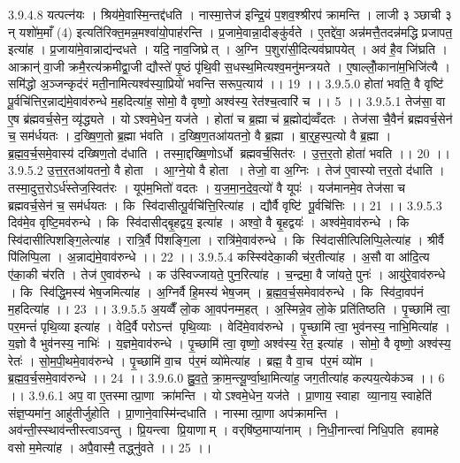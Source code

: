 3.9.4.8
यत्पत्न॑यः । श्रिय॑मे॒वास्मि॒न्तद्द॑धति । नास्मा॒त्तेज॑ इन्द्रि॒यं प॒शव॒श्श्रीरप॑ क्रामन्ति । लाजी ३ ञ्छाची ३ न् यशो॑म॒माँ (4) इत्यति॑रिक्त॒मन्न॒मश्वा॑यो॒पाह॑रन्ति । प्र॒जामे॒वान्ना॒दीङ्कु॑र्वते । ए॒तद्दे॑वा॒ अन्न॑मत्तै॒तदन्न॑मद्धि प्रजापत॒ इत्या॑ह । प्र॒जाया॑मे॒वान्नाद्य॑न्दधते । यदि॒ नाव॒जिघ्रेत् । अ॒ग्नि प॒शुरा॑सी॒दित्यव॑घ्रापयेत् । अव॑ है॒व जि॑घ्रति । आक्रान्॑ वा॒जी क्रमै॒रत्य॑क्रमीद्वा॒जी द्यौस्ते॑ पृ॒ष्ठं पृ॑थि॒वी स॒धस्थ॒मित्यश्व॒मनु॑मन्त्रयते । ए॒षाल्लोँ॒काना॑म॒भिजि॑त्यै । समि॑द्धो अ॒ञ्जन्कृद॑रं मती॒नामित्यश्व॑स्या॒प्रियो॑ भवन्ति सरूप॒त्याय॑ ।। 19 ।।
3.9.5.0
होता॑ भवति॒ वै वृष्टि॑ पू॒र्वचि॑त्तिर॒न्नाद्य॑मे॒वाव॑रुन्धे म॒हदित्या॑ह॒ सोमो॒ वै वृष्णो॒ अश्व॑स्य॒ रेत॑श्च॒त्वारि॑ च ।। 5 ।।
3.9.5.1
तेज॑सा॒ वा ए॒ष ब्र॑ह्मवर्च॒सेन॒ व्यृ॑द्ध्यते । योऽश्वमे॒धेन॒ यज॑ते । होता॑ च ब्र॒ह्मा च॑ ब्र॒ह्मोद्य॑व्वँदतः । तेज॑सा चै॒वैनं॑ ब्रह्मवर्च॒सेन॑ च॒ सम॑र्धयतः । द॒ख्षि॒ण॒तो ब्र॒ह्मा भ॑वति । द॒ख्षि॒ण॒तआ॑यतनो॒ वै ब्र॒ह्मा । बा॒र्॒ह॒स्प॒त्यो वै ब्र॒ह्मा । ब्र॒ह्म॒व॒र्च॒समे॒वास्य॑ दख्षिण॒तो द॑धाति । तस्मा॒द्दख्षि॒णोऽर्धो ब्रह्मवर्च॒सित॑रः । उ॒त्त॒र॒तो होता॑ भवति ।। 20 ।।
3.9.5.2
उ॒त्त॒र॒तआ॑यतनो॒ वै होता । आ॒ग्ने॒यो वै होता । तेजो॒ वा अ॒ग्निः । तेज॑ ए॒वास्योत्तर॒तो द॑धाति । तस्मा॒दुत्त॒रोऽर्ध॑स्तेज॒स्वित॑रः । यूप॑म॒भितो॑ वदतः । य॒ज॒मा॒न॒दे॒व॒त्यो॑ वै यूपः॑ । यज॑मानमे॒व तेज॑सा च ब्रह्मवर्च॒सेन॑ च॒ सम॑र्धयतः । कि स्वि॑दासीत्पू॒र्वचि॑त्ति॒रित्या॑ह । द्यौर्वै वृष्टि॑ पू॒र्वचि॑त्तिः ।। 21 ।।
3.9.5.3
दिव॑मे॒व वृष्टि॒मव॑रुन्धे । कि स्वि॑दासीद्बृ॒हद्वय॒ इत्या॑ह । अश्वो॒ वै बृ॒हद्वयः॑ । अश्व॑मे॒वाव॑रुन्धे । कि स्वि॑दासीत्पिशङ्गि॒लेत्या॑ह । रात्रि॒र्वै पि॑शङ्गि॒ला । रात्रि॑मे॒वाव॑रुन्धे । कि स्वि॑दासीत्पिलिप्पि॒लेत्या॑ह । श्रीर्वै पि॑लिप्पि॒ला । अ॒न्नाद्य॑मे॒वाव॑रुन्धे ।। 22 ।।
3.9.5.4
कस्स्वि॑देका॒की च॑र॒तीत्या॑ह । अ॒सौ वा आ॑दि॒त्य ए॑का॒की च॑रति । तेज॑ ए॒वाव॑रुन्धे । क उ॑स्विज्जायते॒ पुन॒रित्या॑ह । च॒न्द्रमा॒ वै जा॑यते॒ पुनः॑ । आयु॑रे॒वाव॑रुन्धे । कि स्वि॑द्धि॒मस्य॑ भेष॒जमित्या॑ह । अ॒ग्निर्वै हि॒मस्य॑ भेष॒जम् । ब्र॒ह्म॒व॒र्च॒समेवाव॑रुन्धे । कि स्वि॑दा॒वप॑नं म॒हदित्या॑ह ।। 23 ।।
3.9.5.5
अ॒यव्वैँ लो॒क आ॒वप॑नम्म॒हत् । अ॒स्मिन्ने॒व लो॒के प्रति॑तिष्ठति । पृ॒च्छामि॑ त्वा॒ पर॒मन्तं॑ पृथि॒व्या इत्या॑ह । वेदि॒र्वै परोऽन्त॑ पृथि॒व्याः । वेदि॑मे॒वाव॑रुन्धे । पृ॒च्छामि॑ त्वा॒ भुव॑नस्य॒ नाभि॒मित्या॑ह । य॒ज्ञो वै भुव॑नस्य॒ नाभिः॑ । य॒ज्ञमे॒वाव॑रुन्धे । पृ॒च्छामि॑ त्वा॒ वृष्णो॒ अश्व॑स्य॒ रेत॒ इत्या॑ह । सोमो॒ वै वृष्णो॒ अश्व॑स्य॒ रेतः॑ । सो॒म॒पी॒थमे॒वाव॑रुन्धे । पृ॒च्छामि॑ वा॒च प॑र॒मं व्यो॑मेत्या॑ह । ब्रह्म॒ वै वा॒च प॑र॒मं व्यो॑म । ब्र॒ह्म॒व॒र्च॒समे॒वाव॑रुन्धे ।। 24 ।।
3.9.6.0
ह्नु॒व॒ते॒ क्रा॒म॒न्त्यू॒र्ण्वा॒था॒मित्या॑ह॒ जग॒तीत्या॑ह कल्पय॒त्येक॑ञ्च ।। 6 ।।
3.9.6.1
अप॒ वा ए॒तस्मात्प्रा॒णा क्रा॑मन्ति । योऽश्वमे॒धेन॒ यज॑ते । प्रा॒णाय॒ स्वाहा व्या॒नाय॒ स्वाहेति॑ संज्ञ॒प्यमा॑न॒ आहु॑तीर्जुहोति । प्रा॒णाने॒वास्मि॑न्दधाति । नास्मात्प्रा॒णा अप॑क्रामन्ति । अव॑न्ती॒स्स्थाव॑न्तीस्त्वाऽवन्तु । प्रि॒यन्त्वा प्रि॒याणाम् । वर्‌षि॑ष्ठ॒माप्या॑नाम् । नि॒धी॒नान्त्वा॑ निधि॒पति॑ हवामहे वसो म॒मेत्या॑ह । अपै॒वास्मै॒ तद्ध्नु॑वते ।। 25 ।।
